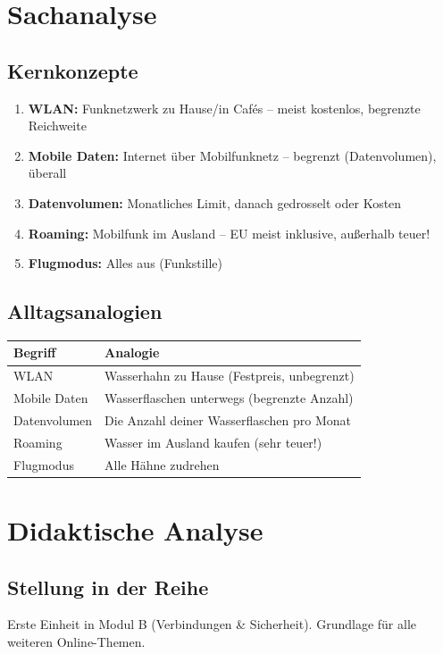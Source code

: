 \documentclass[11pt,a4paper]{article}
\begin{document}
\section{Sachanalyse}

\subsection{Kernkonzepte}
\begin{enumerate}
    \item \textbf{WLAN:} Funknetzwerk zu Hause/in Cafés -- meist kostenlos, begrenzte Reichweite
    \item \textbf{Mobile Daten:} Internet über Mobilfunknetz -- begrenzt (Datenvolumen), überall
    \item \textbf{Datenvolumen:} Monatliches Limit, danach gedrosselt oder Kosten
    \item \textbf{Roaming:} Mobilfunk im Ausland -- EU meist inklusive, außerhalb teuer!
    \item \textbf{Flugmodus:} Alles aus (Funkstille)
\end{enumerate}

\subsection{Alltagsanalogien}
\begin{tabular}{|l|p{8cm}|}
\hline
\textbf{Begriff} & \textbf{Analogie} \\
\hline
WLAN & Wasserhahn zu Hause (Festpreis, unbegrenzt) \\
Mobile Daten & Wasserflaschen unterwegs (begrenzte Anzahl) \\
Datenvolumen & Die Anzahl deiner Wasserflaschen pro Monat \\
Roaming & Wasser im Ausland kaufen (sehr teuer!) \\
Flugmodus & Alle Hähne zudrehen \\
\hline
\end{tabular}

\section{Didaktische Analyse}

\subsection{Stellung in der Reihe}
Erste Einheit in Modul B (Verbindungen \& Sicherheit). Grundlage für alle weiteren Online-Themen.
\end{document}
